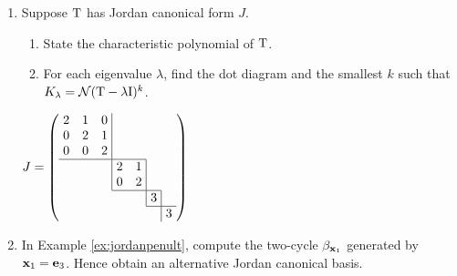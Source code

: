 \begin{exercises}
\begin{enumerate}
  
		\item Suppose $\mathrm{T}$ has Jordan canonical form $J$.\par
		\begin{minipage}[t]{0.6\linewidth}\vspace{0pt}
					\begin{enumerate}
		  \item State the characteristic polynomial of $\mathrm{T}$.
		  \item For each eigenvalue $\lambda$, find the dot diagram and the smallest $k$ such that $K_{\lambda}=\mathcal{N}(\mathrm{T}-\lambda\mathrm{I})^k$.
		\end{enumerate}
		\end{minipage}
		\hfill
		\begin{minipage}[t]{0.39\linewidth}\vspace{-25pt}
			\hfill
			$J=\left(
			\begin{array}{@{}c@{}c@{}c@{}c@{}}
				\begin{array}{@{\ }ccc@{\ }|}
					2 & 1 & 0\\
					0 & 2 & 1\\
					0 & 0 & 2\\\hline
				\end{array}&&&\\[-0.4pt]
				&\begin{array}{|@{\ }cc@{\ }|}\hline
					2 & 1\\
					0 & 2\\\hline
				\end{array}&&\\[-0.4pt]
				&&\begin{array}{|@{\ }c@{\ }|}\hline
					3\\\hline
				\end{array}&\\[-0.4pt]
				&&&\begin{array}{|@{\ }c@{\ }}\hline
					3
				\end{array}
			\end{array}
			\right)$
		\end{minipage}

		
		\item In Example \ref{ex:jordanpenult}, compute the two-cycle $\beta_{{\mathbf{x}}_1}$ generated by ${\mathbf{x}}_1={\mathbf{e}}_3$. Hence obtain an alternative Jordan canonical basis.
		

\end{enumerate}
\end{exercises}
